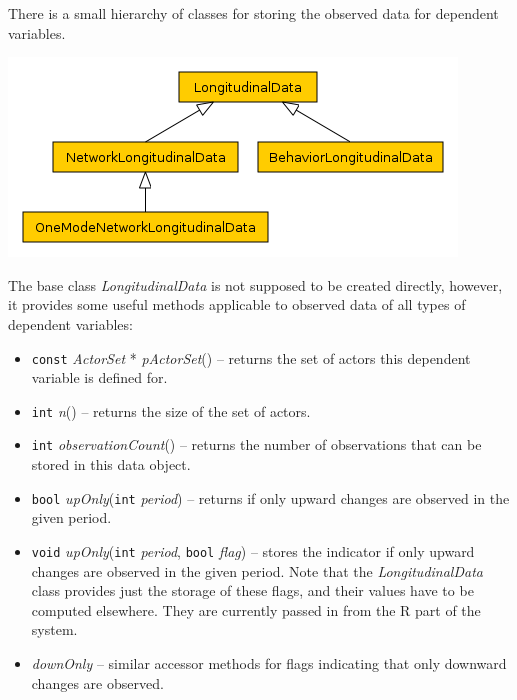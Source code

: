 \documentclass[12pt]{article}
\renewcommand{\=}{\,=\,}
\newcommand{\+}{\,+\,}
\newcommand{\nnm}[1]{\textsf{\small\textit{#1}}}
\begin{document}
There is a small hierarchy of classes for storing the observed data for
dependent variables. 
\begin{center}
\includegraphics[scale=.5]{LongitudinalData.png}
\end{center}
The base class \nnm{LongitudinalData} is not supposed to
be created directly, however, it provides some useful methods applicable to
observed data of all types of dependent variables:
\begin{itemize}
\item \verb|const| \nnm{ActorSet} * \nnm{pActorSet}() -- returns the set of
actors this dependent variable is defined for.
\item \verb|int| \nnm{n}() -- returns the size of the set of actors.
\item \verb|int| \nnm{observationCount}() -- returns the number of observations
that can be stored in this data object.
\item \verb|bool| \nnm{upOnly}(\verb|int| \nnm{period}) -- returns if only
upward changes are observed in the given period.
\item \verb|void| \nnm{upOnly}(\verb|int| \nnm{period}, \verb|bool| \nnm{flag})
-- stores the indicator if only upward changes are observed in the given period.
Note that the \nnm{LongitudinalData} class provides just the storage of these
flags, and their values have to be computed elsewhere. They are currently
passed in from the R part of the system.
\item \nnm{downOnly} -- similar accessor methods for flags indicating that only
downward changes are observed.
\end{itemize}
\end{document}
